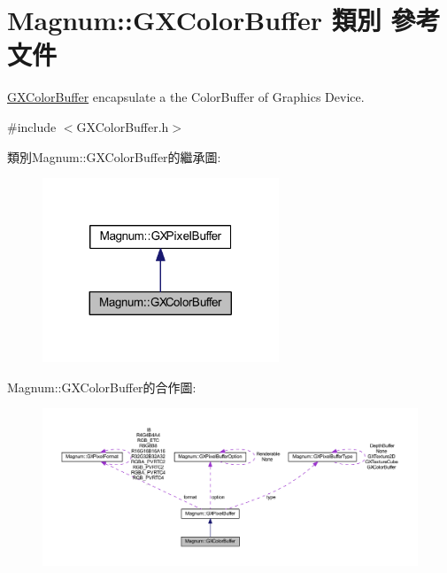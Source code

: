 \hypertarget{class_magnum_1_1_g_x_color_buffer}{}\section{Magnum\+:\+:G\+X\+Color\+Buffer 類別 參考文件}
\label{class_magnum_1_1_g_x_color_buffer}


\hyperlink{class_magnum_1_1_g_x_color_buffer}{G\+X\+Color\+Buffer} encapsulate a the Color\+Buffer of Graphics Device.  




{\ttfamily \#include $<$G\+X\+Color\+Buffer.\+h$>$}



類別\+Magnum\+:\+:G\+X\+Color\+Buffer的繼承圖\+:\nopagebreak
\begin{figure}[H]
\begin{center}
\leavevmode
\includegraphics[width=200pt]{class_magnum_1_1_g_x_color_buffer__inherit__graph}
\end{center}
\end{figure}


Magnum\+:\+:G\+X\+Color\+Buffer的合作圖\+:\nopagebreak
\begin{figure}[H]
\begin{center}
\leavevmode
\includegraphics[width=350pt]{class_magnum_1_1_g_x_color_buffer__coll__graph}
\end{center}
\end{figure}
